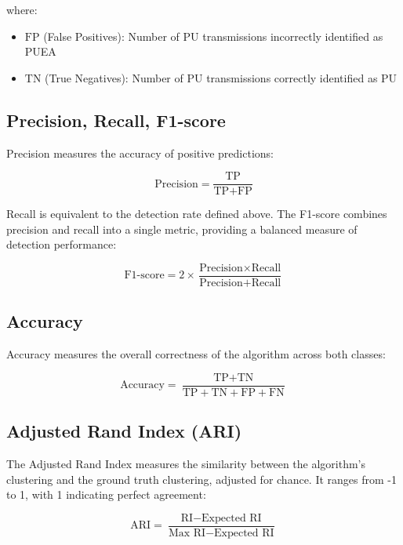 \noindent where:
\begin{itemize}
    \item $\text{FP}$ (False Positives): Number of PU transmissions incorrectly identified as PUEA
    \item $\text{TN}$ (True Negatives): Number of PU transmissions correctly identified as PU
\end{itemize}

\subsection{Precision, Recall, F1-score}

Precision measures the accuracy of positive predictions:

\begin{equation}
    \text{Precision} = \frac{\text{TP}}{\text{TP} + \text{FP}}
\end{equation}

\noindent Recall is equivalent to the detection rate defined above. The F1-score combines precision and recall into a single metric, providing a balanced measure of detection performance:

\begin{equation}
    \text{F1-score} = 2 \times \frac{\text{Precision} \times \text{Recall}}{\text{Precision} + \text{Recall}}
\end{equation}

\subsection{Accuracy}

Accuracy measures the overall correctness of the algorithm across both classes:

\begin{equation}
    \text{Accuracy} = \frac{\text{TP} + \text{TN}}{\text{TP} + \text{TN} + \text{FP} + \text{FN}}
\end{equation}

\subsection{Adjusted Rand Index (ARI)}

The Adjusted Rand Index measures the similarity between the algorithm's clustering and the ground truth clustering, adjusted for chance. It ranges from -1 to 1, with 1 indicating perfect agreement:

\begin{equation}
    \text{ARI} = \frac{\text{RI} - \text{Expected RI}}{\text{Max RI} - \text{Expected RI}}
\end{equation}

